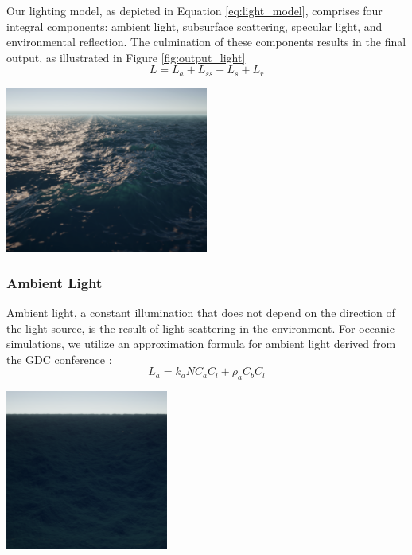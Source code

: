 Our lighting model, as depicted in Equation \ref{eq:light_model}, comprises four integral components: ambient light, subsurface scattering, specular light, and environmental reflection. The culmination of these components results in the final output, as illustrated in Figure \ref{fig:output_light}
\begin{equation}
    L = L_a + L_{ss} + L_s + L_r
    \label{eq:light_model}
\end{equation}
\begin{minipage}{1\textwidth}
    \centering
    \includegraphics[width=0.50\textwidth]{"images/output_light.png"}
    \label{fig:output_light}
\end{minipage}

\subsubsection{Ambient Light}
Ambient light, a constant illumination that does not depend on the direction of the light source, is the result of light scattering in the environment. For oceanic simulations, we utilize an approximation formula for ambient light derived from the GDC conference \cite{mark2021}: 
\begin{equation}
    L_a = k_a N C_a C_l + \rho_a C_b C_l
\end{equation}
\begin{minipage}{1\textwidth}
    \centering
    \includegraphics[width=0.40\textwidth]{"images/ambient_light.png"}
    \label{fig:ambient_light}
\end{minipage}

